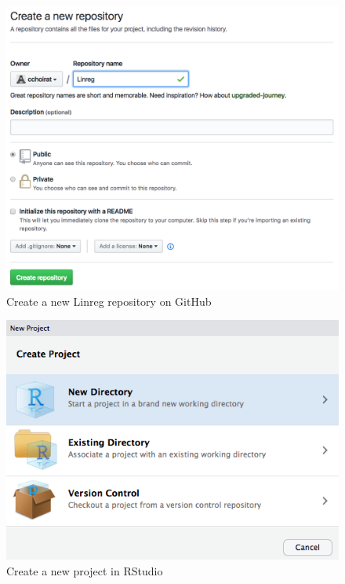 \documentclass[]{book}
\theoremstyle{definition}
\theoremstyle{definition}
\theoremstyle{definition}
\theoremstyle{remark}
\begin{document}
\begin{figure}

{\centering \includegraphics{images/ch3_pkg_1_github} 

}

\caption{Create a new Linreg repository on GitHub}\label{fig:pkg1}
\end{figure}

\begin{figure}

{\centering \includegraphics{images/ch3_pkg_2_project} 

}

\caption{Create a new project in RStudio}\label{fig:pkg2}
\end{figure}
\end{document}
